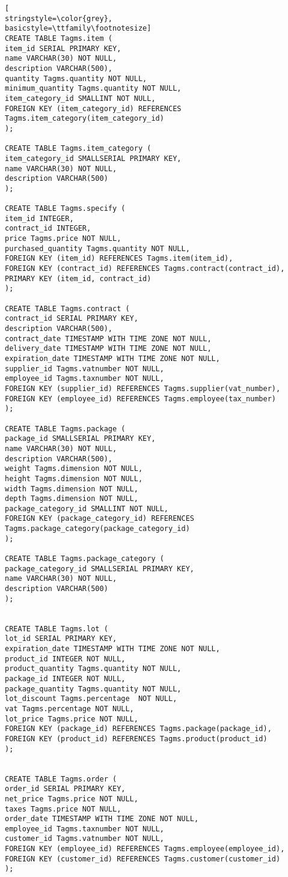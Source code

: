 \begin{lstlisting}[
stringstyle=\color{grey},
basicstyle=\ttfamily\footnotesize]
CREATE TABLE Tagms.item (
item_id SERIAL PRIMARY KEY,
name VARCHAR(30) NOT NULL,
description VARCHAR(500),
quantity Tagms.quantity NOT NULL,
minimum_quantity Tagms.quantity NOT NULL,
item_category_id SMALLINT NOT NULL,
FOREIGN KEY (item_category_id) REFERENCES Tagms.item_category(item_category_id)
);

CREATE TABLE Tagms.item_category (
item_category_id SMALLSERIAL PRIMARY KEY,
name VARCHAR(30) NOT NULL,
description VARCHAR(500)
);

CREATE TABLE Tagms.specify (
item_id INTEGER,
contract_id INTEGER,
price Tagms.price NOT NULL,
purchased_quantity Tagms.quantity NOT NULL,
FOREIGN KEY (item_id) REFERENCES Tagms.item(item_id),
FOREIGN KEY (contract_id) REFERENCES Tagms.contract(contract_id),
PRIMARY KEY (item_id, contract_id)
);

CREATE TABLE Tagms.contract (
contract_id SERIAL PRIMARY KEY,
description VARCHAR(500),
contract_date TIMESTAMP WITH TIME ZONE NOT NULL,
delivery_date TIMESTAMP WITH TIME ZONE NOT NULL,
expiration_date TIMESTAMP WITH TIME ZONE NOT NULL,
supplier_id Tagms.vatnumber NOT NULL,
employee_id Tagms.taxnumber NOT NULL,
FOREIGN KEY (supplier_id) REFERENCES Tagms.supplier(vat_number),
FOREIGN KEY (employee_id) REFERENCES Tagms.employee(tax_number)
);

CREATE TABLE Tagms.package (
package_id SMALLSERIAL PRIMARY KEY,
name VARCHAR(30) NOT NULL,
description VARCHAR(500),
weight Tagms.dimension NOT NULL,
height Tagms.dimension NOT NULL,
width Tagms.dimension NOT NULL,
depth Tagms.dimension NOT NULL,
package_category_id SMALLINT NOT NULL,
FOREIGN KEY (package_category_id) REFERENCES Tagms.package_category(package_category_id)
);

CREATE TABLE Tagms.package_category (
package_category_id SMALLSERIAL PRIMARY KEY,
name VARCHAR(30) NOT NULL,
description VARCHAR(500)
);


CREATE TABLE Tagms.lot (
lot_id SERIAL PRIMARY KEY,
expiration_date TIMESTAMP WITH TIME ZONE NOT NULL,
product_id INTEGER NOT NULL,
product_quantity Tagms.quantity NOT NULL,
package_id INTEGER NOT NULL,
package_quantity Tagms.quantity NOT NULL,
lot_discount Tagms.percentage  NOT NULL,
vat Tagms.percentage NOT NULL,
lot_price Tagms.price NOT NULL,
FOREIGN KEY (package_id) REFERENCES Tagms.package(package_id),
FOREIGN KEY (product_id) REFERENCES Tagms.product(product_id)
);


CREATE TABLE Tagms.order (
order_id SERIAL PRIMARY KEY,
net_price Tagms.price NOT NULL,
taxes Tagms.price NOT NULL,
order_date TIMESTAMP WITH TIME ZONE NOT NULL,
employee_id Tagms.taxnumber NOT NULL,
customer_id Tagms.vatnumber NOT NULL,
FOREIGN KEY (employee_id) REFERENCES Tagms.employee(employee_id),
FOREIGN KEY (customer_id) REFERENCES Tagms.customer(customer_id)
);


\end{lstlisting}

